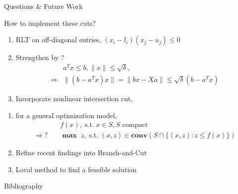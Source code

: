\documentclass[aspectratio=1612, 10pt]{beamer}
\newcommand{\mx}{\mathbf{\max}\;}
\newcommand{\st}{\mathrm{s.t.\;}}
\newcommand{\conv}{\mathbf{conv}}
\begin{document}
\begin{frame}[allowframebreaks]{Questions \& Future Work}

  How to implement these cuts?
  \begin{enumerate}
    \item RLT on off-diagonal entries, \((x_i - l_i)(x_j - u_j) \le 0\)
    \item Strengthen by \cite{ye_new_2003} ?
          \begin{align*}
                        & a^Tx \le b, \|x\| \le \sqrt\delta,                     \\
            \Rightarrow & \|(b - a^Tx)x\| = \|bx - Xa\| \le \sqrt\delta (b-a^Tx)
          \end{align*}
    \item Incorporate nonlinear intersection cut, \cite{modaresi_convex_2017}
  \end{enumerate}

  \begin{enumerate}
    \framebreak

    \item for a general optimization model,
          \begin{align*}
                                & f(x), \;  \st  x \in S, S \text{ compact}                      \\
            \Rightarrow ? \quad & \mx z, \; \st (x, z) \in \conv (S \cap \{(x, z): z \le f(x)\})
          \end{align*}

    \item Refine recent findings into Branch-and-Cut

    \item Local method to find a feasible solution
  \end{enumerate}
\end{frame}
\begin{frame}[allowframebreaks]{Bibliography}
  
  
\end{frame}
\end{document}
